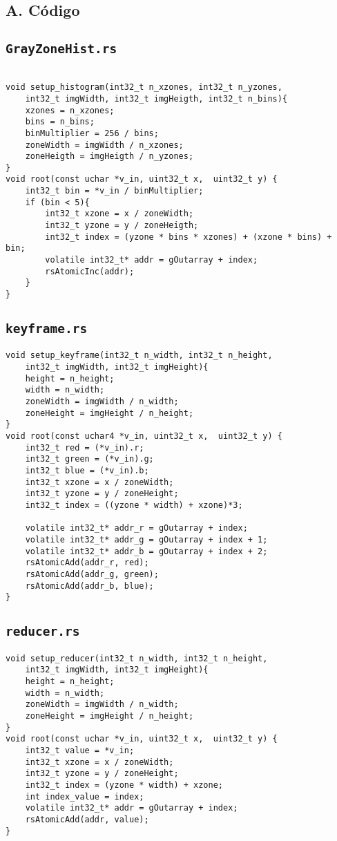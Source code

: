 \begin{Anexos}
\section*{A. Código}
\lstset{style=CInputStyle}
\subsection*{\texttt{GrayZoneHist.rs}}
\begin{lstlisting}

void setup_histogram(int32_t n_xzones, int32_t n_yzones,
    int32_t imgWidth, int32_t imgHeigth, int32_t n_bins){
    xzones = n_xzones;
    bins = n_bins;
    binMultiplier = 256 / bins;
    zoneWidth = imgWidth / n_xzones;
    zoneHeigth = imgHeigth / n_yzones;
}
void root(const uchar *v_in, uint32_t x,  uint32_t y) {
    int32_t bin = *v_in / binMultiplier;
    if (bin < 5){
        int32_t xzone = x / zoneWidth;
        int32_t yzone = y / zoneHeigth;
        int32_t index = (yzone * bins * xzones) + (xzone * bins) + bin;
        volatile int32_t* addr = gOutarray + index;
        rsAtomicInc(addr);
    }
}
\end{lstlisting}

\subsection*{\texttt{keyframe.rs}}
\begin{lstlisting}
void setup_keyframe(int32_t n_width, int32_t n_height,
    int32_t imgWidth, int32_t imgHeight){
    height = n_height;
    width = n_width;
    zoneWidth = imgWidth / n_width;
    zoneHeight = imgHeight / n_height;
}
void root(const uchar4 *v_in, uint32_t x,  uint32_t y) {
    int32_t red = (*v_in).r;
    int32_t green = (*v_in).g;
    int32_t blue = (*v_in).b;
    int32_t xzone = x / zoneWidth;
    int32_t yzone = y / zoneHeight;
    int32_t index = ((yzone * width) + xzone)*3;

    volatile int32_t* addr_r = gOutarray + index;
    volatile int32_t* addr_g = gOutarray + index + 1;
    volatile int32_t* addr_b = gOutarray + index + 2;
    rsAtomicAdd(addr_r, red);
    rsAtomicAdd(addr_g, green);
    rsAtomicAdd(addr_b, blue);
}
\end{lstlisting}


\subsection*{\texttt{reducer.rs}}
\begin{lstlisting}
void setup_reducer(int32_t n_width, int32_t n_height,
    int32_t imgWidth, int32_t imgHeight){
    height = n_height;
    width = n_width;
    zoneWidth = imgWidth / n_width;
    zoneHeight = imgHeight / n_height;
}
void root(const uchar *v_in, uint32_t x,  uint32_t y) {
    int32_t value = *v_in;
    int32_t xzone = x / zoneWidth;
    int32_t yzone = y / zoneHeight;
    int32_t index = (yzone * width) + xzone;
    int index_value = index;
    volatile int32_t* addr = gOutarray + index;
    rsAtomicAdd(addr, value);
}
\end{lstlisting}


\end{Anexos}
